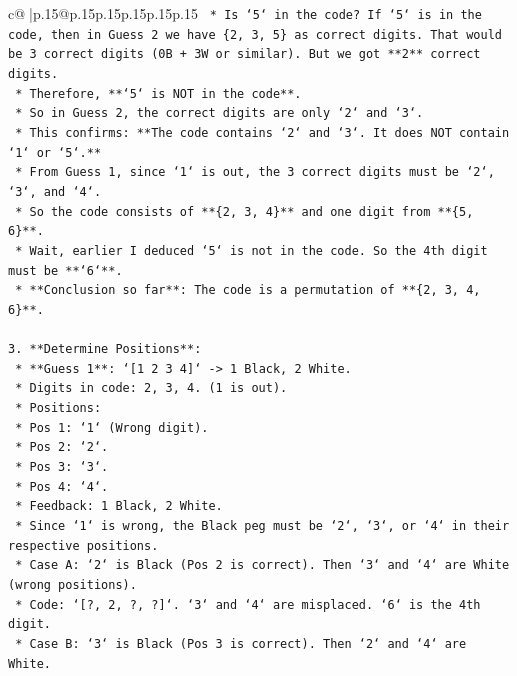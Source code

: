 \documentclass{article}
\begin{document}
{\begin{supertabular}{c@{$\;$}|p{.15\linewidth}@{}p{.15\linewidth}p{.15\linewidth}p{.15\linewidth}p{.15\linewidth}p{.15\linewidth}}
{{{\texttt{                *   Is `5` in the code? If `5` is in the code, then in Guess 2 we have \{2, 3, 5\} as correct digits. That would be 3 correct digits (0B + 3W or similar). But we got **2** correct digits.} \\
\texttt{                *   Therefore, **`5` is NOT in the code**.} \\
\texttt{                *   So in Guess 2, the correct digits are only `2` and `3`.} \\
\texttt{                *   This confirms: **The code contains `2` and `3`. It does NOT contain `1` or `5`.**} \\
\texttt{                *   From Guess 1, since `1` is out, the 3 correct digits must be `2`, `3`, and `4`.} \\
\texttt{                *   So the code consists of **\{2, 3, 4\}** and one digit from **\{5, 6\}**.} \\
\texttt{                *   Wait, earlier I deduced `5` is not in the code. So the 4th digit must be **`6`**.} \\
\texttt{                *   **Conclusion so far**: The code is a permutation of **\{2, 3, 4, 6\}**.} \\
\\ 
\texttt{3.  **Determine Positions**:} \\
\texttt{    *   **Guess 1**: `{[}1 2 3 4{]}` {-}> 1 Black, 2 White.} \\
\texttt{        *   Digits in code: 2, 3, 4. (1 is out).} \\
\texttt{        *   Positions:} \\
\texttt{            *   Pos 1: `1` (Wrong digit).} \\
\texttt{            *   Pos 2: `2`.} \\
\texttt{            *   Pos 3: `3`.} \\
\texttt{            *   Pos 4: `4`.} \\
\texttt{        *   Feedback: 1 Black, 2 White.} \\
\texttt{        *   Since `1` is wrong, the Black peg must be `2`, `3`, or `4` in their respective positions.} \\
\texttt{        *   Case A: `2` is Black (Pos 2 is correct). Then `3` and `4` are White (wrong positions).} \\
\texttt{            *   Code: `{[}?, 2, ?, ?{]}`. `3` and `4` are misplaced. `6` is the 4th digit.} \\
\texttt{        *   Case B: `3` is Black (Pos 3 is correct). Then `2` and `4` are White.} \\
}}}
\end{supertabular}}
\end{document}
